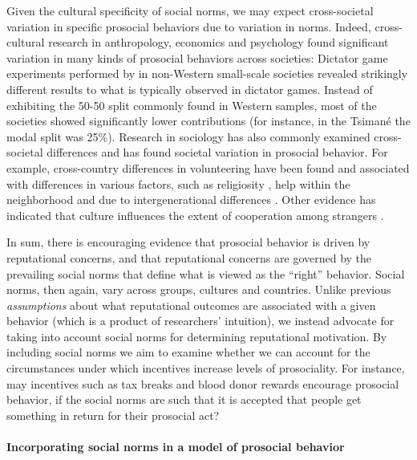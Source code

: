 \documentclass[AER]{AEA}
\begin{document}
Given the cultural specificity of social norms, we may expect cross-societal variation in specific prosocial behaviors due to variation in norms. Indeed, cross-cultural research in anthropology, economics and psychology found significant variation in many kinds of prosocial behaviors across societies: Dictator game experiments performed by \cite{henrich_search_2001} in non-Western small-scale societies revealed strikingly different results to what is typically observed in dictator games. Instead of exhibiting the 50-50 split commonly found in Western samples, most of the societies showed significantly lower contributions (for instance, in the Tsimané the modal split was 25\%). Research in sociology has also commonly examined cross-societal differences and has found societal variation in prosocial behavior. For example, cross-country differences in volunteering have been found and associated with differences in various factors, such as religiosity \citep{ruiter_national_2006}, help within the neighborhood \citep{seifert2019help} and due to intergenerational differences \citep{brandt_intergenerational_2009}. Other evidence has indicated that culture influences the extent of cooperation among strangers \cite[see e.g., experimental evidence from 16 subject pools from six different world cultures presented in ][]{gachter_culture_2010}.

In sum, there is encouraging evidence that prosocial behavior is driven by reputational concerns, and that reputational concerns are governed by the prevailing social norms that define what is viewed as the “right” behavior. Social norms, then again, vary across groups, cultures and countries. Unlike previous \textit{assumptions} about what reputational outcomes are associated with a given behavior (which is a product of researchers’ intuition), we instead advocate for taking into account social norms for determining reputational motivation. By including social norms we aim to examine whether we can account for the circumstances under which incentives increase levels of prosociality. For instance, may incentives such as tax breaks and blood donor rewards encourage prosocial behavior, if the social norms are such that it is accepted that people get something in return for their prosocial act?

\paragraph{Incorporating social norms in a model of prosocial behavior}
\end{document}
